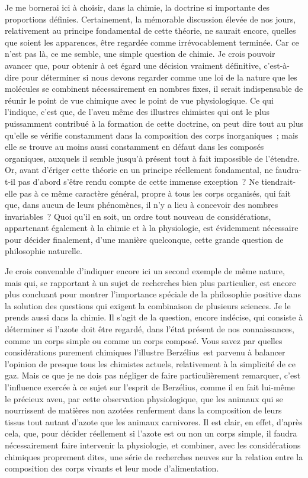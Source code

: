 \documentclass[french,twoside]{book} %
\begin{document}
Je me bornerai ici à choisir, dans la chimie, la doctrine si importante des proportions définies. Certainement, la mémorable discussion élevée de nos jours, relativement au principe fondamental de cette théorie, ne saurait encore, quelles que soient les apparences, être regardée comme irrévocablement terminée. Car ce n’est pas là, ce me semble, une simple question de chimie. Je crois pouvoir avancer que, pour obtenir à cet égard une décision vraiment définitive, c’est-à-dire pour déterminer si nous devons regarder comme une loi de la nature que les molécules se combinent nécessairement en nombres fixes, il serait indispensable de réunir le point de vue chimique avec le point de vue physiologique. Ce qui l’indique, c’est que, de l’aveu même des illustres chimistes qui ont le plus puissamment contribué à la formation de cette doctrine, on peut dire tout au plus qu’elle se vérifie constamment dans la composition des corps inorganiques ; mais elle se trouve au moins aussi constamment en défaut dans les composés organiques, auxquels il semble jusqu’à présent tout à fait impossible de l’étendre. Or, avant d’ériger cette théorie en un principe réellement fondamental, ne faudra-t-il pas d’abord s’être rendu compte de cette immense exception ? Ne tiendrait-elle pas à ce même caractère général, propre à tous les corps organisés, qui fait que, dans aucun de leurs phénomènes, il n’y a lieu à concevoir des nombres invariables ? Quoi qu’il en soit, un ordre tout nouveau de considérations, appartenant également à la chimie et à la physiologie, est évidemment nécessaire pour décider finalement, d’une manière quelconque, cette grande question de philosophie naturelle.\par
Je crois convenable d’indiquer encore ici un second exemple de même nature, mais qui, se rapportant à un sujet de recherches bien plus particulier, est encore plus concluant pour montrer l’importance spéciale de la philosophie positive dans la solution des questions qui exigent la combinaison de plusieurs sciences. Je le prends aussi dans la chimie. Il s’agit de la question, encore indécise, qui consiste à déterminer si l’azote doit être regardé, dans l’état présent de nos connaissances, comme un corps simple ou comme un corps composé. Vous savez par quelles considérations purement chimiques l’illustre Berzélius est parvenu à balancer l’opinion de presque tous les chimistes actuels, relativement à la simplicité de ce gaz. Mais ce que je ne dois pas négliger de faire particulièrement remarquer, c’est l’influence exercée à ce sujet sur l’esprit de Berzélius, comme il en fait lui-même le précieux aveu, par cette observation physiologique, que les animaux qui se nourrissent de matières non azotées renferment dans la composition de leurs tissus tout autant d’azote que les animaux carnivores. Il est clair, en effet, d’après cela, que, pour décider réellement si l’azote est ou non un corps simple, il faudra nécessairement faire intervenir la physiologie, et combiner, avec les considérations chimiques proprement dites, une série de recherches neuves sur la relation entre la composition des corps vivants et leur mode d’alimentation.\par
\end{document}
